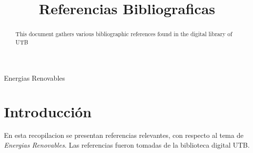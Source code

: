 \documentclass[conference]{IEEEtran}
\begin{document}
\title{Referencias Bibliograficas\\}

\author{
}

\maketitle




\begin{abstract}
	This document gathers various bibliographic references found in the digital library of UTB
\end{abstract}

\begin{IEEEkeywords}
	Energias Renovables
\end{IEEEkeywords}

\nocite{*}

\section{Introducción}

En esta recopilacion se presentan referencias relevantes, con respecto al tema
de \textit{Energias Renovables}. Las referencias fueron tomadas de la
biblioteca digital UTB\@{}.


\end{document}
